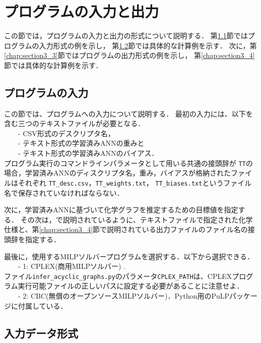 \documentclass[11pt,titlepage,dvipdfmx,twoside]{jsbook}
\newcommand{\target}{目標}
\begin{document}

\section{プログラムの入力と出力}
\label{chap:InOut}

この節では，プログラムの入力と出力の形式について説明する．
第\ref{chap:section3_1}節ではプログラムの入力形式の例を示し，
第\ref{chap:section3_2}節では具体的な計算例を示す．
次に，第\ref{chap:section3_3}節ではプログラムの出力形式の例を示し，
第\ref{chap:section3_4}節では具体的な計算例を示す．


\subsection{プログラムの入力}
\label{chap:section3_1}

この節では、プログラムへの入力について説明する．
最初の入力には、以下を含む三つのテキストファイルが必要となる． \\
~~~~- CSV形式のデスクリプタ名， \\
~~~~- テキスト形式の学習済みANNの重みと\\
~~~~- テキスト形式の学習済みANNのバイアス． \\

プログラム実行のコマンドラインパラメータとして用いる共通の接頭辞が {\tt TT}の場合，学習済みANNのディスクリプタ名，重み，バイアスが格納されたファイルはそれぞれ {\tt TT\_desc.csv}，{\tt TT\_weights.txt}， {\tt TT\_biases.txt}というファイル名で保存されていなければならない．

%
次に，学習済みANNに基づいて化学グラフを推定するための\target 値を指定する．
その次は，\cite{cyclic_BH_arxiv}で説明されているように、テキストファイルで指定された化学仕様と、第\ref{chap:section3_4}節で説明されている出力ファイルのファイル名の接頭辞を指定する．

最後に，使用するMILPソルバープログラムを選択する．以下から選択できる． \\
~~~~- 1: CPLEX(商用MILPソルバー) \cite{cplex}. \\
ファイル{\tt infer\_acyclic\_graphs.py}のパラメータ{\tt CPLEX\_PATH}は、CPLEXプログラム実行可能ファイルの正しいパスに設定する必要があることに注意せよ．\\
~~~~- 2: CBC(無償のオープンソースMILPソルバー)．Python用のPuLPパッケージ\cite{PuLP1}に付属している．



\subsection{入力データ形式}
\label{chap:section3_2}
\end{document}
